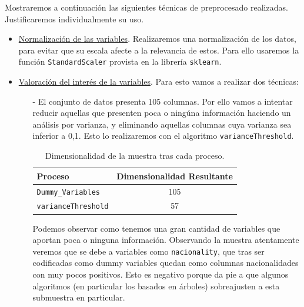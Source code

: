 \documentclass[11pt,a4paper]{article}
\begin{document}
Mostraremos a continuación las siguientes técnicas de preprocesado realizadas. Justificaremos individualmente su uso.

\begin{itemize}

	\item \underline{Normalización de las variables}. Realizaremos una normalización de los datos, para evitar que su escala afecte a la relevancia de estos. Para ello usaremos la función \texttt{StandardScaler}\cite{standardscaler} provista en la librería \texttt{sklearn}.
		\item \underline{Valoración del interés de la variables}. Para esto vamos a realizar dos técnicas:
	
	\begin{itemize}
	\item[-] El conjunto de datos presenta 105 columnas. Por ello vamos a intentar reducir aquellas que presenten poca o ningúna información haciendo un análisis por varianza, y eliminando aquellas columnas cuya varianza sea inferior a 0,1. Esto lo realizaremos con el algoritmo \texttt{varianceThreshold}\cite{einstein}.
			
\begin{table}[h]
\begin{center}
\begin{tabular}{|l|c|}
\hline
 Proceso & Dimensionalidad Resultante \\ \hline
 \texttt{Dummy\_Variables} &  105\\
\texttt{varianceThreshold} &57 \\\hline
\end{tabular}
\end{center}
\caption{Dimensionalidad de la muestra tras cada proceso.}
	\end{table}



Podemos observar como tenemos una gran cantidad de variables que aportan poca o ninguna información. Observando la muestra atentamente veremos que se debe a variables como \texttt{nacionality}, que tras ser codificadas como dummy variables quedan como columnas nacionalidades con muy pocos positivos. Esto es negativo porque da pie a que algunos algoritmos (en particular los basados en árboles) sobreajusten a esta submuestra en particular. \\


\end{itemize}
\end{itemize}
\end{document}
